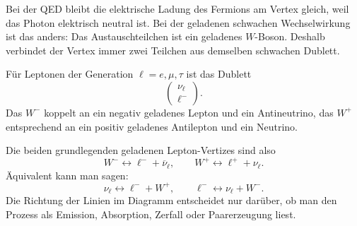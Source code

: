 \documentclass[11pt,a4paper]{scrartcl}
\begin{document}
\begin{calculationbox}
Bei der QED bleibt die elektrische Ladung des Fermions am Vertex gleich, weil das Photon elektrisch neutral ist. Bei der geladenen schwachen Wechselwirkung ist das anders: Das Austauschteilchen ist ein geladenes $W$-Boson. Deshalb verbindet der Vertex immer zwei Teilchen aus demselben schwachen Dublett.

Für Leptonen der Generation $\ell=e,\mu,\tau$ ist das Dublett
\[
\begin{pmatrix}
\nu_\ell\\
\ell^-
\end{pmatrix}.
\]
Das $W^-$ koppelt an ein negativ geladenes Lepton und ein Antineutrino, das $W^+$ entsprechend an ein positiv geladenes Antilepton und ein Neutrino.

\begin{calculationbox}
Die beiden grundlegenden geladenen Lepton-Vertizes sind also
\[
W^- \longleftrightarrow \ell^- + \overline{\nu}_\ell,
\qquad
W^+ \longleftrightarrow \ell^+ + \nu_\ell.
\]
Äquivalent kann man sagen:
\[
\nu_\ell \leftrightarrow \ell^- + W^+,
\qquad
\ell^- \leftrightarrow \nu_\ell + W^-.
\]
Die Richtung der Linien im Diagramm entscheidet nur darüber, ob man den Prozess als Emission, Absorption, Zerfall oder Paarerzeugung liest.
\end{calculationbox}

\begin{center}
\end{center}
\end{calculationbox}
\end{document}
